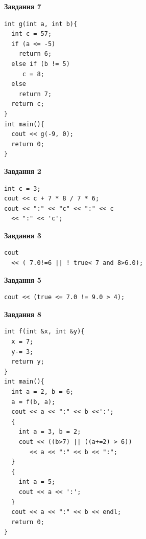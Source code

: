 \documentclass[12pt, ukrainian]{article}
\begin{document}
{\begin {large}
\begin{minipage}[t]{7.0cm}
\begin{center}
\textbf{Завдання 7}
\end{center}
\vspace{-8mm}

\begin{verbatim}
int g(int a, int b){
  int c = 57;
  if (a <= -5)
    return 6;
  else if (b != 5)
     c = 8;
  else
    return 7;
  return c;
}
int main(){
  cout << g(-9, 0);
  return 0;
}
\end{verbatim}

\end{minipage}
\vline \hspace{1mm}
\begin{minipage}[t]{11.0cm}

\begin{center}
\textbf{Завдання 2}
\end{center}
\vspace{-8mm}

\begin{verbatim}
int c = 3;
cout << c + 7 * 8 / 7 * 6;
cout << ":" << "c" << ":" << c 
  << ":" << 'c';
\end{verbatim}



\begin{center}
\textbf{Завдання 3}
\end{center}
\vspace{-8mm}

\begin{verbatim}
cout 
  << ( 7.0!=6 || ! true< 7 and 8>6.0);
\end{verbatim}



\begin{center}
\textbf{Завдання 5}
\end{center}
\vspace{-8mm}

\begin{verbatim}
cout << (true <= 7.0 != 9.0 > 4);
\end{verbatim}



\begin{center}
\textbf{Завдання 8}
\end{center}
\vspace{-8mm}

\begin{verbatim}
int f(int &x, int &y){
  x = 7;
  y-= 3;
  return y;
}
int main(){
  int a = 2, b = 6;
  a = f(b, a);
  cout << a << ":" << b <<':';
  {
    int a = 3, b = 2;
    cout << ((b>7) || ((a+=2) > 6))
       << a << ":" << b << ":";
  }
  {
    int a = 5;
    cout << a << ':';
  }
  cout << a << ":" << b << endl;
  return 0;
}
\end{verbatim}


\end{minipage}
\end{large}}
\end{document}

